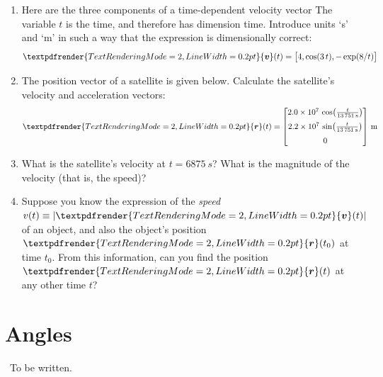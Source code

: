 \documentclass[a4paper,12pt,%
onecolumn,oneside,%
british%
]{memoir}
\renewcommand*{\bm}[1]{\textpdfrender{TextRenderingMode=2,LineWidth=0.2pt}{\boldsymbol{#1}}}
\newcommand{\mynotew}[1]{{\footnotesize\color{midgrey}\faIcon{tools}\ #1}}
\DeclarePairedDelimiter\abs{\lvert}{\rvert}
\renewcommand*{\|}[1][]{\nonscript\:#1\vert\nonscript\:\mathopen{}}
\newcommand*{\yr}{\bm{r}}
\newcommand*{\yv}{\bm{v}}
\newcommand*{\yti}{t_{0}}
\begin{document}
\begin{exercise}
  \begin{enumerate}[exerc]
  \item Here are the three components of a time-dependent velocity vector The variable $t$ is the time, and therefore has dimension \textsf{time}. Introduce units \enquote*{\unit{s}} and \enquote*{\unit{m}}  in such a way that the expression is dimensionally correct:
    \begin{equation*}
      \bm{v}(t) = \bigl[4, \cos(3\,t), -\exp(8/t)\bigr]
    \end{equation*}
  \item The position vector of a satellite is given below. Calculate the satellite's velocity and acceleration vectors:
    \begin{equation*}
      \yr(t) =
      \begin{bmatrix}
        \num[exponent-mode=scientific]{20e+6}\,
        \cos\bigl(\frac{t}{\qty{13751}{s}}\bigr)\\[2\jot]
        \num[exponent-mode=scientific]{22e+6}\,
        \sin\bigl(\frac{t}{\qty{13751}{s}}\bigr)\\[2\jot]
        \num{0}
      \end{bmatrix}\,\unit{m}
    \end{equation*}
  \item What is the satellite's velocity at $t=\qty{6875}{s}$? What is the magnitude of the velocity (that is, the speed)?

  \item Suppose you know the expression of the \emph{speed} $v(t) \equiv \abs{\yv(t)}$ of an object, and also the object's position $\yr(\yti)$ at time $\yti$. From this information, can you find the position $\yr(t)$ at any other time $t$?
  \end{enumerate}
\end{exercise}



\section{Angles}
\label{sec:angles}

\mynotew{To be written.}
\end{document}

